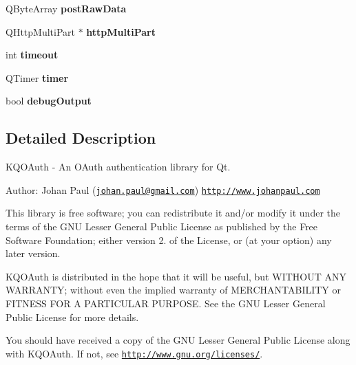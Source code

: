 \begin{DoxyCompactItemize}
\item 
\mbox{\label{class_k_q_o_auth_request_private_ab0b658005849625caed76749f093c69f}} 
Q\+Byte\+Array {\bfseries post\+Raw\+Data}
\item 
\mbox{\label{class_k_q_o_auth_request_private_a297952d2084b236ce4f17eac694b52ab}} 
Q\+Http\+Multi\+Part $\ast$ {\bfseries http\+Multi\+Part}
\item 
\mbox{\label{class_k_q_o_auth_request_private_aa4c5ad3b8003ffc79ac26b10fd67f734}} 
int {\bfseries timeout}
\item 
\mbox{\label{class_k_q_o_auth_request_private_acae02bc4cb7621d9bc4b04eee490f6ae}} 
Q\+Timer {\bfseries timer}
\item 
\mbox{\label{class_k_q_o_auth_request_private_af9146038f81c917ed0c4f315dfcbf090}} 
bool {\bfseries debug\+Output}
\end{DoxyCompactItemize}


\subsection{Detailed Description}
K\+Q\+O\+Auth -\/ An O\+Auth authentication library for Qt.

Author\+: Johan Paul (\href{mailto:johan.paul@gmail.com}{\tt johan.\+paul@gmail.\+com}) \href{http://www.johanpaul.com}{\tt http\+://www.\+johanpaul.\+com}

This library is free software; you can redistribute it and/or modify it under the terms of the G\+NU Lesser General Public License as published by the Free Software Foundation; either version 2. of the License, or (at your option) any later version.

K\+Q\+O\+Auth is distributed in the hope that it will be useful, but W\+I\+T\+H\+O\+UT A\+NY W\+A\+R\+R\+A\+N\+TY; without even the implied warranty of M\+E\+R\+C\+H\+A\+N\+T\+A\+B\+I\+L\+I\+TY or F\+I\+T\+N\+E\+SS F\+OR A P\+A\+R\+T\+I\+C\+U\+L\+AR P\+U\+R\+P\+O\+SE. See the G\+NU Lesser General Public License for more details.

You should have received a copy of the G\+NU Lesser General Public License along with K\+Q\+O\+Auth. If not, see \href{http://www.gnu.org/licenses/}{\tt http\+://www.\+gnu.\+org/licenses/}. 

